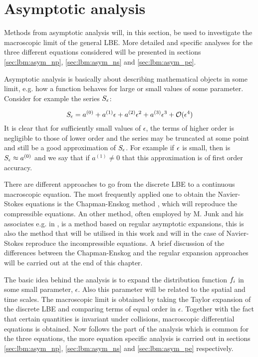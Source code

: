 \section{Asymptotic analysis}\label{sec:lbm:asym}
Methods from asymptotic analysis will, in this section, be used to
investigate the macroscopic limit of the general LBE. More detailed and
specific analyses for the three different equations considered will be
presented in sections \ref{sec:lbm:asym_np}, \ref{sec:lbm:asym_ns} and
\ref{sec:lbm:asym_pe}. 

Asymptotic analysis is basically about describing mathematical objects
in some limit, e.g. how a function behaves for large or small values
of some parameter. Consider for example the series $S_{\epsilon}$:

\begin{equation}
S_{\epsilon} = a^{(0)} + a^{(1)}\epsilon + a^{(2)}\epsilon^2 +
a^{(3)}\epsilon^3 + \mathcal{O}(\epsilon^4)
\end{equation}
It is clear that for sufficiently small values of $\epsilon$, the
terms of higher order is negligible to those of lower order and the
series may be truncated at some point and still be a good
approximation of $S_{\epsilon}$. For example if $\epsilon$ is small, then is
$S_{\epsilon} \approx a^{(0)}$ and we say that if $a^{(1)} \neq 0$ that
this approximation is of first order accuracy.

There are different approaches to go from the discrete LBE to a
continuous macroscopic equation. The most frequently applied one to
obtain the Navier-Stokes equations is the Chapman-Enskog method
\cite{junk-boundary}, which will reproduce the compressible
equations. An other method, often employed by M. Junk and his
associates e.g. in \cite{junk-asym}, is a method based on regular
asymptotic expansions, this is also the method that will be utilised
in this work and will in the case of Navier-Stokes reproduce the
incompressible equations. A brief discussion of the differences
between the Chapman-Enskog and the regular expansion approaches will
be carried out at the end of this chapter.

The basic idea behind the analysis is to expand the distribution
function $f_i$ in some small parameter, $\epsilon$. Also this
parameter will be related to the spatial and time scales. The
macroscopic limit is obtained by taking the Taylor expansion of the
discrete LBE and comparing terms of equal order in
$\epsilon$. Together with the fact that certain quantities is
invariant under collisions, macroscopic differential equations is
obtained. Now follows the part of the analysis which is common for the
three equations, the more equation specific analysis is carried out in
sections \ref{sec:lbm:asym_np}, \ref{sec:lbm:asym_ns} and
\ref{sec:lbm:asym_pe} respectively.

